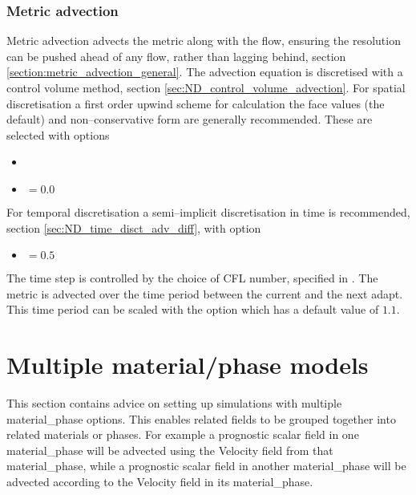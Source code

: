 \subsubsection{Metric advection}
\label{sec:configuring_fluidity_metric_advection}
Metric advection advects the metric along with the flow, ensuring the resolution can be pushed ahead of any flow, rather than lagging behind, section \ref{section:metric_advection_general}. The advection equation is discretised with a control volume method,  section \ref{sec:ND_control_volume_advection}. For spatial discretisation a first order upwind scheme for calculation the face values (the default) and non--conservative form are generally recommended. These are selected with options
\begin{itemize}
\item {}
\item {} $=0.0$
\end{itemize}
For temporal discretisation a semi--implicit discretisation in time is recommended, section \ref{sec:ND_time_disct_adv_diff}, with option
\begin{itemize}
\item {} $=0.5$
\end{itemize}
The time step is controlled by the choice of CFL number, specified in . The metric is advected over the time period between the current and the next adapt. This time period can be scaled with the option  which has a default value of $1.1$.

\section{Multiple material/phase models} \label{sec:config_multimatph}

This section contains advice on setting up simulations with multiple material\_phase options.  This enables related fields to be grouped together into related materials or phases.  For example a prognostic scalar field in one material\_phase will be advected using the Velocity field from that material\_phase, while a prognostic scalar field in another material\_phase will be advected according to the Velocity field in its material\_phase.

